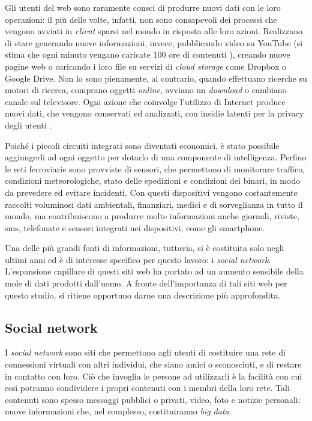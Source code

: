 Gli utenti del web sono raramente consci di produrre nuovi dati con le loro operazioni: il più delle volte, infatti, non sono consapevoli dei processi che vengono avviati in \textit{client} 
sparsi nel mondo in risposta alle loro azioni. Realizzano di stare generando nuove informazioni, invece, pubblicando video su YouTube (si stima che ogni minuto vengano caricate 
100 ore di contenuti \cite{URL:mediastats2014}), creando nuove pagine web o caricando i loro file su servizi di \textit{cloud storage} come Dropbox o Google Drive. 
Non lo sono pienamente, al contrario, quando effettuano ricerche su motori di ricerca, comprano oggetti \textit{online}, avviano un \textit{download} o cambiano 
canale sul televisore. Ogni azione che coinvolge l’utilizzo di Internet produce nuovi dati, che vengono conservati ed analizzati, con insidie latenti per la privacy degli 
utenti \cite{privacy1} \cite{privacy2}.

Poiché i piccoli circuiti integrati sono diventati economici, è stato possibile aggiungerli ad ogni oggetto per dotarlo di una componente di intelligenza. Perfino le reti ferroviarie 
sono provviste di sensori, che permettono di monitorare traffico, condizioni meteorologiche, stato delle spedizioni e condizioni dei binari, in modo da prevedere ed evitare incidenti. 
Con questi dispositivi vengono costantemente raccolti voluminosi dati ambientali, finanziari, medici e di sorveglianza in tutto il mondo, ma contribuiscono a produrre molte informazioni
anche giornali, riviste, sms, telefonate e sensori integrati nei dispositivi, come gli smartphone.

Una delle più grandi fonti di informazioni, tuttavia, si è costituita solo negli ultimi anni ed è di interesse specifico per questo lavoro: i \textit{social network}. L’espansione capillare 
di questi siti web ha portato ad un aumento sensibile della mole di dati prodotti dall’uomo. A fronte dell’importanza di tali siti web per questo studio, si ritiene opportuno darne 
una descrizione più approfondita.

\subsection{Social network}
I \textit{social network} sono siti che permettono agli utenti di costituire una rete di connessioni virtuali con altri individui, che siano amici o sconosciuti, e di restare in contatto con 
loro. Ciò che invoglia le persone ad utilizzarli è la facilità con cui essi potranno condividere i propri contenuti con i membri della loro rete. Tali contenuti sono spesso messaggi 
pubblici o privati, video, foto e notizie personali: nuove informazioni che, nel complesso, costituiranno \textit{big data}.

